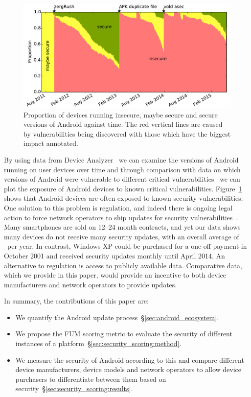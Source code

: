 \documentclass{sig-alternate}
\let\OldTodo\todo
\renewcommand{\todo}{\OldTodo[inline]}
\newcommand{\todolater}[1]{}%
\newcommand{\da}{Device Analyzer}
\begin{document}
\begin{figure}
\centering
\includegraphics[width=\columnwidth]{figures/proportioninsecure}
\caption{Proportion of devices running insecure, maybe secure and secure versions of Android against time.
The red vertical lines are caused by vulnerabilities being discovered with those which have the biggest impact annotated.
}
\label{fig:proportioninsecure}
\end{figure}
By using data from \da~\cite{Wagner2013} we can examine the versions of Android running on user devices over time and through comparison with data on which versions of Android were vulnerable to different critical vulnerabilities~\cite{androidvulnerabilities.org} we can plot the exposure of Android devices to known critical vulnerabilities.
Figure~\ref{fig:proportioninsecure} shows that Android devices are often exposed to known security vulnerabilities.
One solution to this problem is regulation, and indeed there is ongoing legal action to force network operators to ship updates for security vulnerabilities~\cite{Soghoian2013}.\todolater{Check on the status of this legal action}
Many smartphones are sold on 12--24 month contracts, and yet our data shows many devices do not receive many security updates, with an overall average of \daUpdatesPerYearNominal\ per year. 
In contrast, Windows XP could be purchased for a one-off payment in October 2001 and received security updates monthly until April 2014.
An alternative to regulation is access to publicly available data.
Comparative data, which we provide in this paper, would provide an incentive to both device manufacturers and network operators to provide updates.

In summary, the contributions of this paper are:
\begin{itemize}
 \item We quantify the Android update process~\S\ref{sec:android_ecosystem}.
 \item We propose the FUM scoring metric to evaluate the security of different instances of a platform~\S\ref{sec:security_scoring:method}.
 \item We measure the security of Android according to this and compare different device manufacturers, device models and network operators to allow device purchasers to differentiate between them based on security~\S\ref{sec:security_scoring:results}.
\end{itemize}
\end{document}
